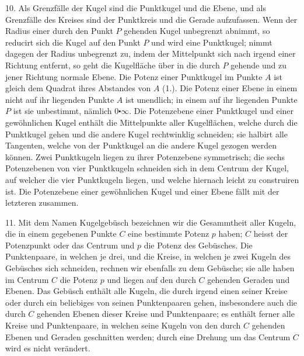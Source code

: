 10. Als Grenzf\"alle der Kugel sind die Punktkugel und
die Ebene, und als Grenzf\"alle des Kreises sind der Punktkreis
und die Gerade aufzufassen. Wenn der Radius einer
durch den Punkt $P$ gehenden Kugel unbegrenzt abnimmt,
so reducirt sich die Kugel auf den Punkt $P$ und wird eine
Punktkugel; nimmt dagegen der Radius unbegrenzt zu, indem
der Mittelpunkt sich nach irgend einer Richtung entfernt,
so geht die Kugelfl\"ache \"uber in die durch $P$ gehende
und zu jener Richtung normale Ebene. Die Potenz einer
Punktkugel im Punkte $A$ ist gleich dem Quadrat ihres Abstandes
von $A$ (1.). Die Potenz einer Ebene in einem nicht
auf ihr liegenden Punkte $A$ ist unendlich; in einem auf ihr
liegenden Punkte $P$ ist sie unbestimmt, n\"amlich $0 \centerdot \infty$. Die
Potenzebene einer Punktkugel und einer gew\"ohnlichen Kugel
enth\"alt die Mittelpunkte aller Kugelfl\"achen, welche durch
die Punktkugel gehen und die andere Kugel rechtwinklig
schneiden; sie halbirt alle Tangenten, welche von der Punktkugel
an die andere Kugel gezogen werden k\"onnen. Zwei
Punktkugeln liegen zu ihrer Potenzebene symmetrisch; die
sechs Potenzebenen von vier Punktkugeln schneiden sich
in dem Centrum der Kugel, auf welcher die vier Punktkugeln
liegen, und welche hiernach leicht zu construiren ist.
Die Potenzebene einer gew\"ohnlichen Kugel und einer Ebene
f\"allt mit der letzteren zusammen.

\begin{center}
\makebox[15em]{\hrulefill}
\end{center}

\label{p2}


\hspace{\parindent}%
11. Mit dem Namen {\glqq}Kugelgeb\"usch{\grqq} bezeichnen wir
die Gesammtheit aller Kugeln, die in einem gegebenen Punkte
$C$ eine bestimmte Potenz $p$ haben; $C$ heisst der Potenzpunkt
oder das {\glqq}Centrum{\grqq} und $p$ die {\glqq}Potenz des Geb\"usches{\grqq}. Die
Punktenpaare, in welchen je drei, und die Kreise, in welchen
je zwei Kugeln des Geb\"usches sich schneiden, rechnen wir
ebenfalls zu dem Geb\"usche; sie alle haben im Centrum $C$ die
Potenz $p$ und liegen auf den durch $C$ gehenden Geraden und
Ebenen. Das Geb\"usch enth\"alt alle Kugeln, die durch irgend
einen seiner Kreise oder durch ein beliebiges von seinen
Punktenpaaren gehen, insbesondere auch die durch $C$ gehenden
Ebenen dieser Kreise und Punktenpaare; es enth\"alt ferner alle
Kreise und Punktenpaare, in welchen seine Kugeln von den
durch $C$ gehenden Ebenen und Geraden geschnitten werden;
durch eine Drehung um das Centrum $C$ wird es nicht ver\"andert.

